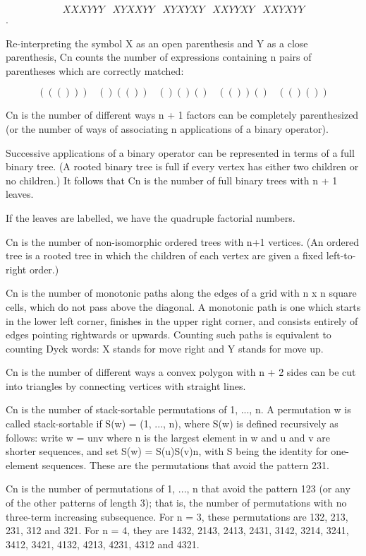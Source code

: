 \documentclass[10pt,letterpaper,twocolumn,twosided]{article}
\begin{document}
$$XXXYYY \;\;\;   XYXXYY  \;\;\;  XYXYXY  \;\;\;  XXYYXY   \;\;\;  XXYXYY$$.

Re-interpreting the symbol X as an open parenthesis and Y as a close parenthesis, Cn counts the number of expressions containing n pairs of parentheses which are correctly matched:

$$((()))   \;\;\;  ()(())    \;\;\; ()()()   \;\;\;  (())()   \;\;\;  (()())$$

Cn is the number of different ways n + 1 factors can be completely parenthesized (or the number of ways of associating n applications of a binary operator).

Successive applications of a binary operator can be represented in terms of a full binary tree. (A rooted binary tree is full if every vertex has either two children or no children.) It follows that Cn is the number of full binary trees with n + 1 leaves.

If the leaves are labelled, we have the quadruple factorial numbers.

Cn is the number of non-isomorphic ordered trees with n+1 vertices. (An ordered tree is a rooted tree in which the children of each vertex are given a fixed left-to-right order.)

Cn is the number of monotonic paths along the edges of a grid with n x n square cells, which do not pass above the diagonal. A monotonic path is one which starts in the lower left corner, finishes in the upper right corner, and consists entirely of edges pointing rightwards or upwards. Counting such paths is equivalent to counting Dyck words: X stands for move right and Y stands for move up.

Cn is the number of different ways a convex polygon with n + 2 sides can be cut into triangles by connecting vertices with straight lines.

Cn is the number of stack-sortable permutations of {1, ..., n}. A permutation w is called stack-sortable if S(w) = (1, ..., n), where S(w) is defined recursively as follows: write w = unv where n is the largest element in w and u and v are shorter sequences, and set S(w) = S(u)S(v)n, with S being the identity for one-element sequences. These are the permutations that avoid the pattern 231.

Cn is the number of permutations of {1, ..., n} that avoid the pattern 123 (or any of the other patterns of length 3); that is, the number of permutations with no three-term increasing subsequence. For n = 3, these permutations are 132, 213, 231, 312 and 321. For n = 4, they are 1432, 2143, 2413, 2431, 3142, 3214, 3241, 3412, 3421, 4132, 4213, 4231, 4312 and 4321.
\end{document}
